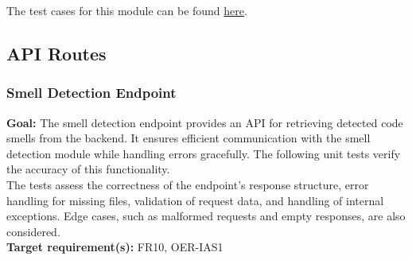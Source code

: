 \documentclass[12pt, titlepage]{article}
\begin{document}
\noindent The test cases for this module can be found \href{https://github.com/ssm-lab/capstone--sco-vs-code-plugin/blob/plugin-multi-file/test/commands/wipeWorkCache.test.ts}{here}.

\subsection{API Routes}

\subsubsection{Smell Detection Endpoint}

\textbf{Goal:} The smell detection endpoint provides an API for retrieving detected code smells from the backend. It ensures efficient communication with the smell detection module while handling errors gracefully. The following unit tests verify the accuracy of this functionality.\\

\noindent The tests assess the correctness of the endpoint’s response structure, error handling for missing files, validation of request data, and handling of internal exceptions. Edge cases, such as malformed requests and empty responses, are also considered.\\

\noindent\textbf{Target requirement(s):} FR10, OER-IAS1~\cite{SRS} \\
\end{document}
